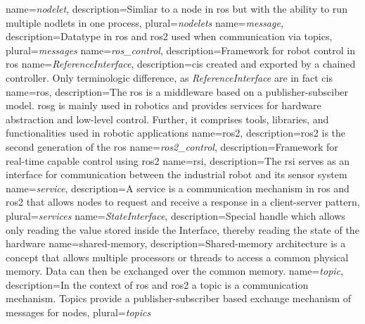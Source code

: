 {
    name={\textit{nodelet}},
    description={Simliar to a \gls{node} in \gls{ros} but with the ability to run multiple nodlets in one process},
    plural={\textit{nodelets}}
}
{
    name={\textit{message}},
    description={Datatype in \gls{ros} and \gls{ros2} used when communication via \glspl{topic}},
    plural={\textit{messages}}
}
{
    name={\textit{ros\_control}},
    description={Framework for robot control in \gls{ros}}
}
{
    name={\textit{ReferenceInterface}},
    description={\Glspl{ci} created and exported by a chained controller. Only terminologic difference, as \textit{ReferenceInterface} are in fact \glspl{ci}}
}
{
    name={\gls{ros}},
    description={The \acrlong{ros} is a middleware based on a publisher-subsciber model. \gls{rosg} is mainly used in robotics and provides services for hardware abstraction and low-level control. Further, it comprises tools, libraries, and functionalities used in robotic applications}
}
{
    name={\gls{ros2}},
    description={\acrlong{ros2} is the second generation of the \acrlong{ros} \cite{macenski_robot_2022}}
}
{
    name={\textit{ros2\_control}},
    description={Framework for real-time capable control using \gls{ros2}}
}
{
    name={\gls{rsi}},
    description={The \acrlong{rsi} serves as an interface for communication between the industrial robot and its sensor system }
}
{
    name={\textit{service}},
    description={A service is a communication mechanism in \gls{ros} and \gls{ros2} that allows \glspl{node} to request and receive a response in a client-server pattern},
    plural={\textit{services}}
}
{
    name={\textit{StateInterface}},
    description={Special \gls{handle} which allows only reading the value stored inside the Interface, thereby reading the state of the hardware}
}
{
    name={shared-memory},
    description={Shared-memory architecture is a concept that allows multiple processors or threads to access a common physical memory. Data can then be exchanged over the common memory. }
}
{
    name={\textit{topic}},
    description={In the context of \gls{ros} and \gls{ros2} a topic is a communication mechanism. Topics provide a publisher-subscriber based exchange mechanism of \glspl{message} for \glspl{node}},
    plural={\textit{topics}}
}